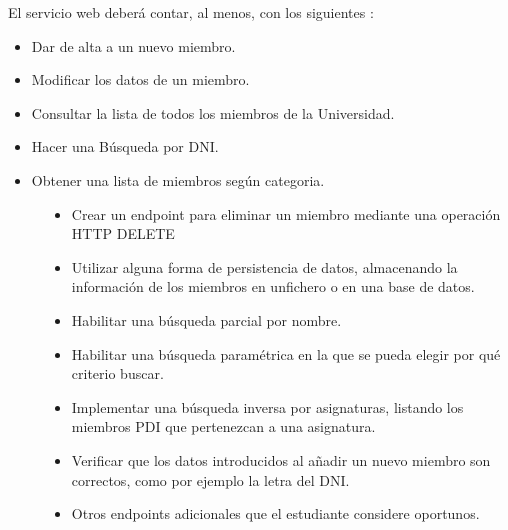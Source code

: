 \documentclass[letterpaper,10pt,spanish]{sphinxmanual}
\begin{document}
\sphinxAtStartPar
El servicio web deberá contar, al menos, con los siguientes :
\begin{itemize}
\item {} 
\sphinxAtStartPar
Dar de alta a un nuevo miembro.

\item {} 
\sphinxAtStartPar
Modificar los datos de un miembro.

\item {} 
\sphinxAtStartPar
Consultar la lista de todos los miembros de la Universidad.

\item {} 
\sphinxAtStartPar
Hacer una Búsqueda por DNI.

\item {} 
\sphinxAtStartPar
Obtener una lista de miembros según categoria.

\end{itemize}
\begin{description}
\item[{}] \leavevmode\begin{itemize}
\item {} 
\sphinxAtStartPar
Crear un endpoint para eliminar un miembro mediante una operación HTTP DELETE

\item {} 
\sphinxAtStartPar
Utilizar alguna forma de persistencia de datos, almacenando la información de los miembros en unfichero o en una base de datos.

\item {} 
\sphinxAtStartPar
Habilitar una búsqueda parcial por nombre.

\item {} 
\sphinxAtStartPar
Habilitar una búsqueda paramétrica en la que se pueda elegir por qué criterio buscar.

\item {} 
\sphinxAtStartPar
Implementar una búsqueda inversa por asignaturas, listando los miembros PDI que pertenezcan a una asignatura.

\item {} 
\sphinxAtStartPar
Verificar que los datos introducidos al añadir un nuevo miembro son correctos, como por ejemplo la letra del DNI.

\item {} 
\sphinxAtStartPar
Otros endpoints adicionales que el estudiante considere oportunos.

\end{itemize}

\end{description}
\end{document}
